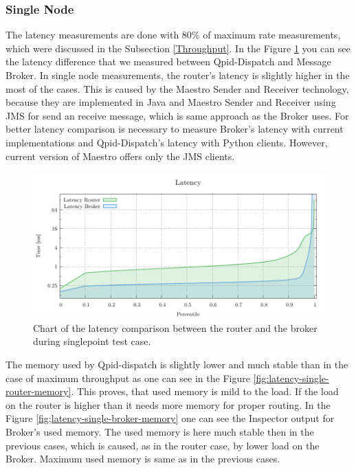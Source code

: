 \subsubsection*{Single Node}
The latency measurements are done with 80\% of maximum rate measurements, which were discussed in the Subsection \ref{Throughput}. In the Figure \ref{fig:latency-single-router} you can see the latency difference that we measured between Qpid-Dispatch and Message Broker. In single node measurements, the router's latency is slightly higher in the most of the cases. This is caused by the Maestro Sender and Receiver technology, because they are implemented in Java and Maestro Sender and Receiver using JMS for send an receive message, which is same approach as the Broker uses. For better latency comparison is necessary to measure Broker's latency with current implementations and Qpid-Dispatch's latency with Python clients. However, current version of Maestro offers only the JMS clients.

\begin{figure}[H]
	\centering
	\includegraphics[width=1\linewidth]{obrazky-figures/charts/singlepoint-latency.pdf}
	\caption{Chart of the latency comparison between the router and the broker during singlepoint test case.}
	\label{fig:latency-single-router}
\end{figure}

The memory used by Qpid-dispatch is slightly lower and much stable than in the case of maximum throughput as one can see in the Figure \ref{fig:latency-single-router-memory}. This proves, that used memory is mild to the  load. If the load on the router is higher than it needs more memory for proper routing. In the Figure \ref{fig;latency-single-broker-memory} one can see the Inspector output for Broker's used memory. The used memory is here much stable then in the previous cases, which is caused, as in the router case, by lower load on the Broker. Maximum used memory is same as in the previous cases.

